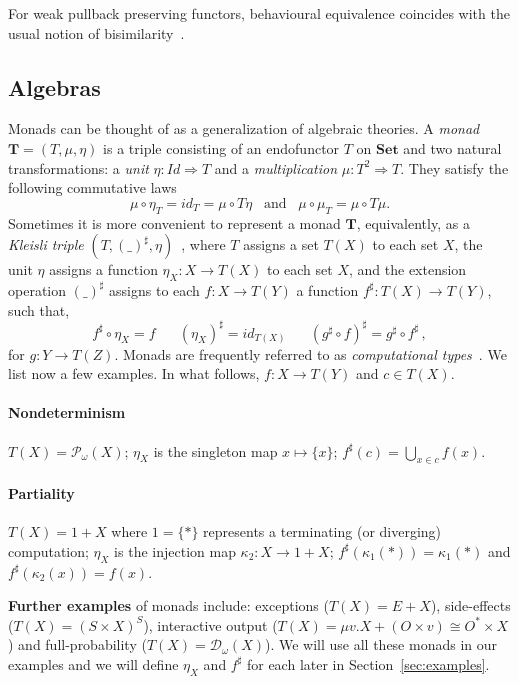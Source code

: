 \documentclass{LMCS}
\def\pow#1{{\mathcal P_\omega}#1}
\def\T{\mathbf{T}}
\def\Set{\mathbf{Set}}
\begin{document}
For weak pullback preserving functors, behavioural equivalence coincides with the usual notion 
of bisimilarity~\cite{Rutten00}.
   
\subsection{Algebras}
Monads can be thought of as a generalization of algebraic theories.
A \emph{monad} $\T = (T,\mu,\eta)$ is a triple consisting of an
endofunctor $T$ on $\Set$ and two natural transformations: a
\emph{unit} $\eta\colon \mathit{Id} \Rightarrow T$ and a \emph{multiplication} $\mu\colon
T^2 \Rightarrow T$.
They satisfy the following commutative laws
\[
\mu \circ \eta_T = id_T = \mu \circ T\eta
\;\;\;\mbox{and}\;\;\;
\mu \circ \mu_T = \mu \circ T\mu.
\]
Sometimes it is more convenient to represent a monad $\T$, equivalently, as a \emph{Kleisli triple}
$(T, (\_)^\sharp, \eta)$~\cite{Man76}, where $T$ assigns a set $T(X)$ to each
set $X$, the unit $\eta$ assigns a function $\eta_X \colon X \to T(X)$  to each set $X$,
and the extension operation $(\_)^\sharp$  assigns  to each
$f \colon X \rightarrow T(Y)$ a function $f^\sharp \colon T(X) \rightarrow T(Y)$, such that,
\[
f^\sharp \circ \eta_X = f
\;\;\;\;\;\;
(\eta_X)^\sharp = id_{T(X)}
\;\;\;\;\;\;
(g^\sharp \circ f)^\sharp
= g^\sharp \circ f^\sharp \,,
\]
for $g\colon Y  \rightarrow T(Z)$. Monads are frequently referred to
as \emph{computational types}~\cite{Moggi}. We list now a few examples. In what follows, $f\colon X\to T(Y)$ and $c\in T(X)$.


\paragraph{\textbf{Nondeterminism}} $T(X) = \pow(X)$; $\eta_X$ is the singleton map $x\mapsto \{x\}$;  $f^\sharp (c) = \bigcup_{x\in c} f(x)$.
\paragraph{\textbf{Partiality}} $T(X)  = 1+ X $ where $1=\{*\}$ represents a terminating (or diverging) computation; $\eta_X$ is the injection map $\kappa_2 \colon X\to 1+X$; $f^\sharp(\kappa_1(*)) = \kappa_1(*)$ and $f^\sharp(\kappa_2(x)) = f(x)$.

\smallskip

\noindent\textbf{Further examples} of monads include: exceptions ($T(X)= E +X$), side-effects
($T(X) = (S \times X)^S$), interactive output ($T(X) =  \mu v. X +
(O\times v) \cong O^*\times X$) and full-probability ($T(X) = \mathcal
D_\omega (X)$). We will use all these monads in our examples and we
will define $\eta_X$ and $f^\sharp$ for each later in
Section~\ref{sec:examples}.
\end{document}

